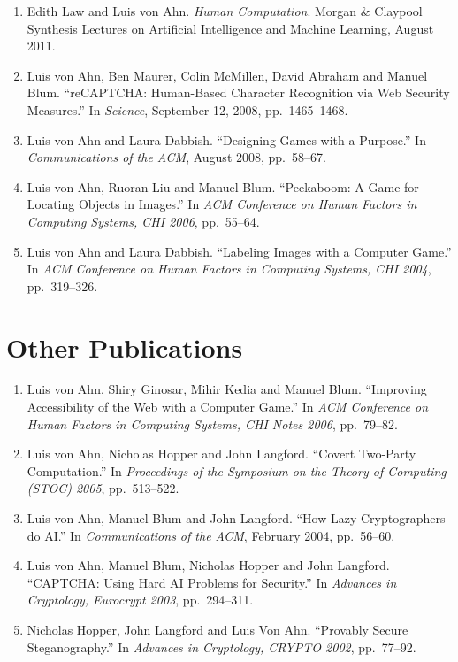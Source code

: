 \documentclass{article}
\newenvironment{denseenumerate}%
	{\begin{enumerate}\setlength{\itemsep}{0pt}\setlength{\parsep}{0pt}}%
	{\end{enumerate}}
\begin{document}
\begin{denseenumerate}
\item Edith Law and Luis von Ahn. {\em Human Computation}. Morgan \& 
Claypool Synthesis Lectures on Artificial Intelligence and Machine 
Learning, August 2011.

\item Luis von Ahn, Ben Maurer, Colin McMillen, David Abraham and 
Manuel Blum. ``reCAPTCHA: Human-Based Character Recognition via Web 
Security Measures.'' In {\em Science}, September 12, 2008, 
pp.~1465--1468.

\item Luis von Ahn and Laura Dabbish. ``Designing Games with a 
Purpose.'' In {\em Communications of the ACM}, August 2008, 
pp.~58--67.

\item Luis von Ahn, Ruoran Liu and Manuel Blum. ``Peekaboom: A Game 
for Locating Objects in Images.'' In {\em ACM Conference on Human 
Factors in Computing Systems, CHI 2006}, pp.~55--64.

\item Luis von Ahn and Laura Dabbish. ``Labeling Images with a 
Computer Game.'' In {\em ACM Conference on Human Factors in 
Computing Systems, CHI 2004}, pp.~319--326.
\end{denseenumerate}

\section*{Other Publications}
\begin{denseenumerate}
\item Luis von Ahn, Shiry Ginosar, Mihir Kedia and Manuel Blum. 
``Improving Accessibility of the Web with a Computer Game.'' In 
{\em ACM Conference on Human Factors in Computing Systems, CHI 
Notes 2006}, pp.~79--82.

\item Luis von Ahn, Nicholas Hopper and John Langford. ``Covert 
Two-Party Computation.'' In {\em Proceedings of the Symposium on 
the Theory of Computing (STOC) 2005}, pp.~513--522.

\item Luis von Ahn, Manuel Blum and John Langford. ``How Lazy 
Cryptographers do AI.'' In {\em Communications of the ACM}, 
February 2004, pp.~56--60.

\item Luis von Ahn, Manuel Blum, Nicholas Hopper and John Langford. 
``CAPTCHA: Using Hard AI Problems for Security.'' In {\em Advances 
in Cryptology, Eurocrypt 2003}, pp.~294--311.

\item Nicholas Hopper, John Langford and Luis Von Ahn. ``Provably 
Secure Steganography.'' In {\em Advances in Cryptology, CRYPTO 
2002}, pp.~77--92.
\end{denseenumerate}
\end{document}
